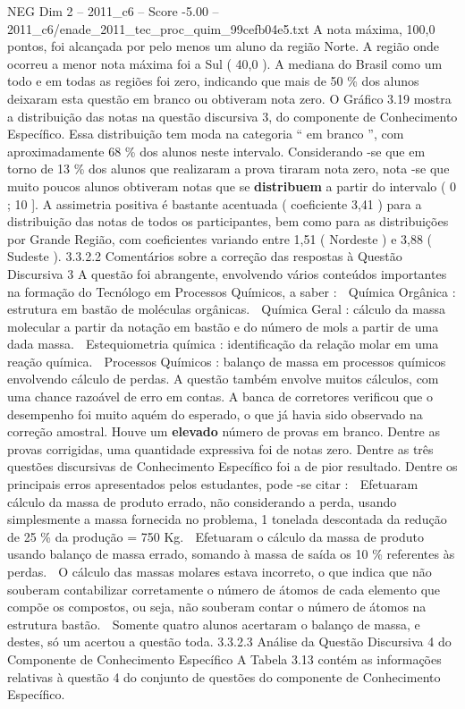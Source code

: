 \begin{textsample}{NEG Dim 2 – 2011\_c6 – Score -5.00 – 2011\_c6/enade\_2011\_tec\_proc\_quim\_99cefb04e5.txt}
A nota máxima, 100,0 pontos, foi alcançada por pelo menos um aluno da região Norte.
A região onde ocorreu a menor nota máxima foi a Sul ( 40,0 ).
A mediana do Brasil como um todo e em todas as regiões foi zero, indicando que mais de 50 \% dos alunos deixaram esta questão em branco ou obtiveram nota zero.
O Gráfico 3.19 mostra a distribuição das notas na questão discursiva 3, do componente de Conhecimento Específico.
Essa distribuição tem moda na categoria “ em branco ”, com aproximadamente 68 \% dos alunos neste intervalo.
Considerando -se que em torno de 13 \% dos alunos que realizaram a prova tiraram nota zero, nota -se que muito poucos alunos obtiveram notas que se \textbf{distribuem} a partir do intervalo ( 0 ; 10 ].
A assimetria positiva é bastante acentuada ( coeficiente 3,41 ) para a distribuição das notas de todos os participantes, bem como para as distribuições por Grande Região, com coeficientes variando entre 1,51 ( Nordeste ) e 3,88 ( Sudeste ). 3.3.2.2 Comentários sobre a correção das respostas à Questão Discursiva 3 A questão foi abrangente, envolvendo vários conteúdos importantes na formação do Tecnólogo em Processos Químicos, a saber :  Química Orgânica : estrutura em bastão de moléculas orgânicas.  Química Geral : cálculo da massa molecular a partir da notação em bastão e do número de mols a partir de uma dada massa.  Estequiometria química : identificação da relação molar em uma reação química.  Processos Químicos : balanço de massa em processos químicos envolvendo cálculo de perdas.
A questão também envolve muitos cálculos, com uma chance razoável de erro em contas.
A banca de corretores verificou que o desempenho foi muito aquém do esperado, o que já havia sido observado na correção amostral.
Houve um \textbf{elevado} número de provas em branco.
Dentre as provas corrigidas, uma quantidade expressiva foi de notas zero.
Dentre as três questões discursivas de Conhecimento Específico foi a de pior resultado.
Dentre os principais erros apresentados pelos estudantes, pode -se citar :  Efetuaram cálculo da massa de produto errado, não considerando a perda, usando simplesmente a massa fornecida no problema, 1 tonelada descontada da redução de 25 \% da produção = 750 Kg.  Efetuaram o cálculo da massa de produto usando balanço de massa errado, somando à massa de saída os 10 \% referentes às perdas.  O cálculo das massas molares estava incorreto, o que indica que não souberam contabilizar corretamente o número de átomos de cada elemento que compõe os compostos, ou seja, não souberam contar o número de átomos na estrutura bastão.  Somente quatro alunos acertaram o balanço de massa, e destes, só um acertou a questão toda. 3.3.2.3 Análise da Questão Discursiva 4 do Componente de Conhecimento Específico A Tabela 3.13 contém as informações relativas à questão 4 do conjunto de questões do componente de Conhecimento Específico.

\end{textsample}

